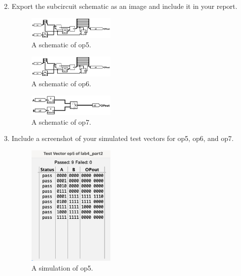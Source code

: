 \documentclass{article}
\begin{document}
\begin{enumerate}
\setcounter{enumi}{1}
\item Export the subcircuit schematic as an image and include it in your report.

\begin{figure}[ht!]
    \centering
    \includegraphics[width=0.4\textwidth]{lab4_op5.png}
    \caption{A schematic of op5.}
    \label{f:op5}
\end{figure}

\begin{figure}[ht!]
    \centering
    \includegraphics[width=0.4\textwidth]{lab4_op6.png}
    \caption{A schematic of op6.}
    \label{f:op6}
\end{figure}

\begin{figure}[ht!]
    \centering
    \includegraphics[width=0.4\textwidth]{lab4_op7.png}
    \caption{A schematic of op7.}
    \label{f:op7}
\end{figure}

\item Include a screenshot of your simulated test vectors for op5, op6, and op7.

\begin{figure}[ht!]
    \centering
    \includegraphics[width=0.4\textwidth]{lab4_op5_simulation.png}
    \caption{A simulation of op5.}
    \label{f:op5_simulation}
\end{figure}


\end{enumerate}
\end{document}
